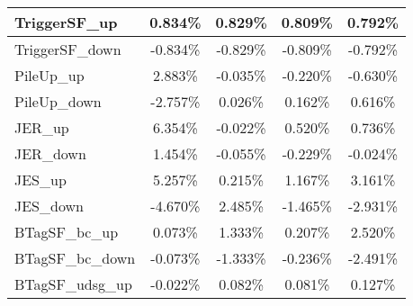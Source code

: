 \begin{table}[]
{\begin{tabular}{|l|c|c|c|c|}
TriggerSF\_up                               & 0.834\%                                & 0.829\%                                & 0.809\%                               & 0.792\%                                \\ \hline 
TriggerSF\_down                             & -0.834\%                              & -0.829\%                              & -0.809\%                             & -0.792\%                              \\ \hline 
PileUp\_up                             & 2.883\%                              & -0.035\%                              & -0.220\%                             & -0.630\%                              \\ \hline 
PileUp\_down                           & -2.757\%                            & 0.026\%                            & 0.162\%                           & 0.616\%                            \\ \hline 
JER\_up                         & 6.354\%                          & -0.022\%                          & 0.520\%                         & 0.736\%                          \\ \hline     
JER\_down                       & 1.454\%                        & -0.055\%                        & -0.229\%                       & -0.024\%                        \\ \hline    
JES\_up                                 & 5.257\%                                  & 0.215\%                                  & 1.167\%                                 & 3.161\%                                  \\ \hline    
JES\_down                               & -4.670\%                                & 2.485\%                                & -1.465\%                               & -2.931\%                                \\ \hline    
BTagSF\_bc\_up                              & 0.073\%                               & 1.333\%                               & 0.207\%                              & 2.520\%                               \\ \hline    
BTagSF\_bc\_down                            & -0.073\%                             & -1.333\%                             & -0.236\%                            & -2.491\%                             \\ \hline    
BTagSF\_udsg\_up                            & -0.022\%                             & 0.082\%                             & 0.081\%                            & 0.127\%                             \\ \hline     

\end{tabular}}
\end{table}
